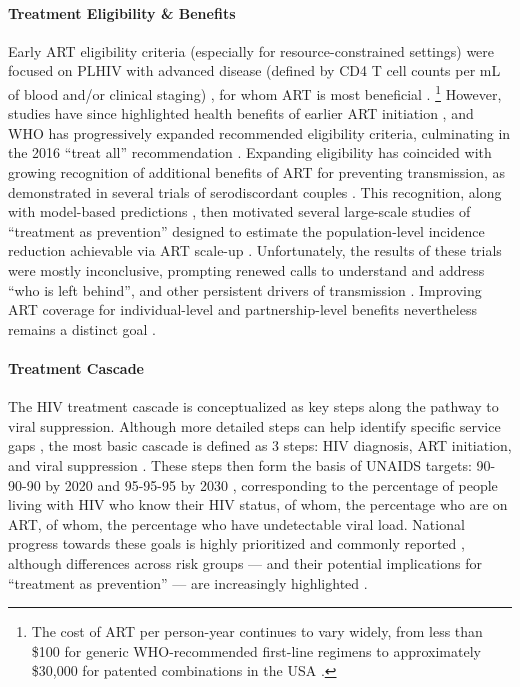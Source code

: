 \paragraph{Treatment Eligibility \& Benefits}
Early ART eligibility criteria (especially for resource-constrained settings)
were focused on PLHIV with advanced disease
(defined by CD4 T cell counts per mL of blood and/or clinical staging) \cite{WHO2003art},
for whom ART is most beneficial \cite{Gabillard2013,Maartens2014}.%
\footnote{The cost of ART per person-year continues to vary widely,
from less than \$100 for generic WHO-recommended first-line regimens
to approximately \$30,000 for patented combinations in the USA \cite{MSF2016ART}.}
However, studies have since highlighted health benefits of earlier ART initiation
\cite{Cohen2011art,Grinsztejn2014,Lundgren2015,Danel2015},
and WHO has progressively expanded recommended eligibility criteria,
culminating in the 2016 ``treat all'' recommendation
\cite{WHO2003art,WHO2007art,WHO2013art,WHO2016art}.
Expanding eligibility has coincided with growing recognition of
additional benefits of ART for preventing transmission,
as demonstrated in several trials of serodiscordant couples
\cite{Anglemyer2013,Cohen2016,Rodger2019}.
This recognition, along with model-based predictions \cite{Granich2009,Eaton2012},
then motivated several large-scale studies of ``treatment as prevention''
designed to estimate the population-level incidence reduction achievable via ART scale-up
\cite{Havlir2019,Hayes2019,Iwuji2018}.
Unfortunately, the results of these trials were mostly inconclusive,
prompting renewed calls to understand and address ``who is left behind'',
and other persistent drivers of transmission \cite{Akullian2017,Eisinger2019tk,Baral2019,Havlir2020}.
Improving ART coverage for individual-level and partnership-level benefits
nevertheless remains a distinct goal \cite{959595}.
\paragraph{Treatment Cascade}
The HIV treatment cascade is conceptualized as key steps along the pathway to viral suppression.
Although more detailed steps can help identify specific service gaps \cite{Mountain2014exp},
the most basic cascade is defined as 3 steps:
HIV diagnosis, ART initiation, and viral suppression \cite{909090}.
These steps then form the basis of UNAIDS targets:
\mbox{90-90-90} by 2020 \cite{909090} and \mbox{95-95-95} by 2030 \cite{959595},
corresponding to the percentage of people living with HIV who know their HIV status,
of whom, the percentage who are on ART,
of whom, the percentage who have undetectable viral load.
National progress towards these goals is highly prioritized and commonly reported \cite{AIDSinfo},
although differences across risk groups
--- and their potential implications for ``treatment as prevention'' ---
are increasingly highlighted \cite{Akullian2017,Hakim2018,Green2020}.
